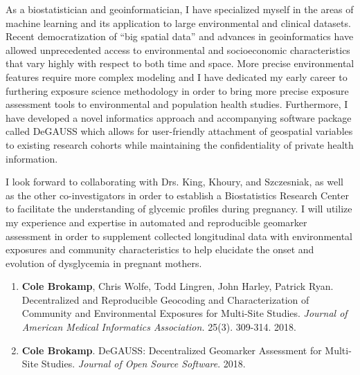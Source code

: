 \documentclass{nihbiosketch}
\begin{document}
\begin{statement}

As a biostatistician and geoinformatician, I have specialized myself in the
areas of machine learning and its application to large environmental and
clinical datasets. Recent democratization of “big spatial data” and advances in
geoinformatics have allowed unprecedented access to environmental and
socioeconomic characteristics that vary highly with respect to both time and
space. More precise environmental features require more complex modeling and I
have dedicated my early career to furthering exposure science methodology in
order to bring more precise exposure assessment tools to environmental and
population health
studies. Furthermore, I have developed a novel informatics approach and
accompanying software package called DeGAUSS which allows for user-friendly
attachment of geospatial variables to existing research cohorts while
maintaining the confidentiality of private health information.

I look forward to collaborating with Drs. King, Khoury, and Szczesniak, as well
as the other co-investigators in order to establish a Biostatistics Research
Center to facilitate the understanding of glycemic profiles during pregnancy.
I will utilize my experience and expertise in automated and reproducible geomarker
assessment in order to supplement collected longitudinal data with environmental
exposures and community characteristics to help elucidate the onset and
evolution of dysglycemia in pregnant mothers.\\

\begin{enumerate}

	\item \textbf{Cole Brokamp}, Chris Wolfe, Todd Lingren, John Harley, Patrick Ryan. Decentralized and Reproducible Geocoding and Characterization of Community and Environmental Exposures for Multi-Site Studies. \textit{Journal of American Medical Informatics Association.} 25(3). 309-314. 2018.
	
	\item \textbf{Cole Brokamp}. DeGAUSS: Decentralized Geomarker Assessment for Multi-Site Studies. \textit{Journal of Open Source Software}. 2018. 

\end{enumerate}

\end{statement}

\end{document}
